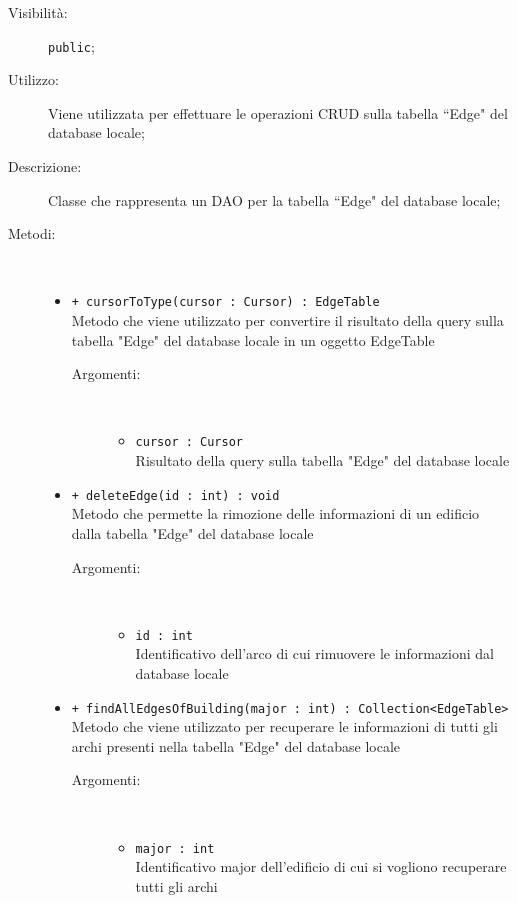\documentclass[../DefinizioneDiProdotto.tex]{subfiles}
\begin{document}
\begin{description}
\begin{itemize}
\end{itemize}
\item[Visibilità:] \texttt{public};
\item[Utilizzo:] Viene utilizzata per effettuare le operazioni CRUD sulla tabella “Edge" del database locale;
\item[Descrizione:] Classe che rappresenta un DAO per la tabella “Edge" del database locale;
\item[Metodi:] \
\begin{itemize}
\item \texttt{+ cursorToType(cursor : Cursor) : EdgeTable}\\
Metodo che viene utilizzato per convertire il risultato della query sulla tabella "Edge" del database locale in un oggetto EdgeTable
 \begin{description}
\item[Argomenti:] \
\begin{itemize}
\item \texttt{cursor : Cursor}\\
Risultato della query sulla tabella "Edge" del database locale\end{itemize}
\end{description}
\item \texttt{+ deleteEdge(id : int) : void}\\
Metodo che permette la rimozione delle informazioni di un edificio dalla tabella "Edge" del database locale 
 \begin{description}
\item[Argomenti:] \
\begin{itemize}
\item \texttt{id : int}\\
Identificativo dell'arco di cui rimuovere le informazioni dal database locale\end{itemize}
\end{description}
\item \texttt{+ findAllEdgesOfBuilding(major : int) : Collection<EdgeTable>}\\
Metodo che viene utilizzato per recuperare le informazioni di tutti gli archi presenti nella tabella "Edge" del database locale
 \begin{description}
\item[Argomenti:] \
\begin{itemize}
\item \texttt{major : int}\\
Identificativo major dell'edificio di cui si vogliono recuperare tutti gli archi\end{itemize}

\end{description}
\end{itemize}
\end{description}
\end{document}
